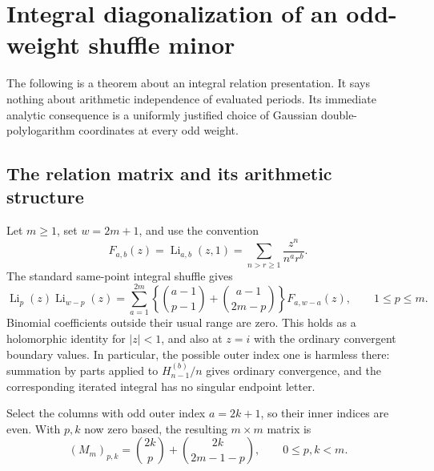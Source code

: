 
\section{Integral diagonalization of an odd-weight shuffle minor}
\label{oi:sec:shuffle}

The following is a theorem about an integral relation presentation.
It says nothing about arithmetic independence of evaluated periods.
Its immediate analytic consequence is a uniformly justified choice of
Gaussian double-polylogarithm coordinates at every odd weight.

\subsection{The relation matrix and its arithmetic structure}

Let $m\geq1$, set $w=2m+1$, and use the convention
\[
 F_{a,b}(z)=\operatorname{Li}_{a,b}(z,1)
 =\sum_{n>r\geq1}\frac{z^n}{n^a r^b}.
\]
The standard same-point integral shuffle gives
\begin{equation}\label{oi:eq:shuffle}
 \operatorname{Li}_{p}(z)\operatorname{Li}_{w-p}(z)
 =\sum_{a=1}^{2m}
 \left\{\binom{a-1}{p-1}+\binom{a-1}{2m-p}\right\}F_{a,w-a}(z),
 \qquad 1\leq p\leq m.
\end{equation}
Binomial coefficients outside their usual range are zero.  This holds
as a holomorphic identity for $|z|<1$, and also at $z=i$ with the
ordinary convergent boundary values.  In particular, the possible outer
index one is harmless there: summation by parts applied to
$H_{n-1}^{(b)}/n$ gives ordinary convergence, and the corresponding
iterated integral has no singular endpoint letter.

Select the columns with odd outer index $a=2k+1$, so their inner indices
are even.  With $p,k$ now zero based, the resulting $m\times m$ matrix is
\begin{equation}\label{oi:eq:M}
 (M_m)_{p,k}=
 \binom{2k}{p}+\binom{2k}{2m-1-p},
 \qquad 0\leq p,k<m.
\end{equation}


